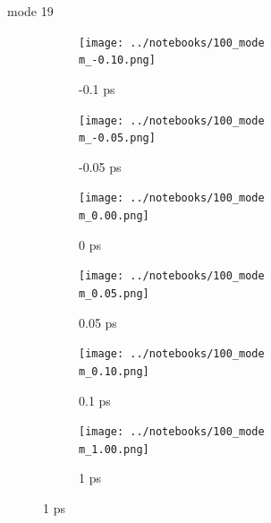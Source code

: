 \documentclass{beamer}
\begin{document}
\renewcommand\m{19}
\begin{frame}{mode \m}
	\begin{figure}
		\centering
		\begin{subfigure}[b]{\w\textwidth}
			\centering
			\texttt{[image: ../notebooks/100\_mode\\m\_-0.10.png]}
			\caption{-0.1 ps}
		\end{subfigure}
		\begin{subfigure}[b]{\w\textwidth}
			\centering
			\texttt{[image: ../notebooks/100\_mode\\m\_-0.05.png]}
			\caption{-0.05 ps}
		\end{subfigure}
		\begin{subfigure}[b]{\w\textwidth}
			\centering
			\texttt{[image: ../notebooks/100\_mode\\m\_0.00.png]}
			\caption{0 ps}
		\end{subfigure}
		\begin{subfigure}[b]{\w\textwidth}
			\centering
			\texttt{[image: ../notebooks/100\_mode\\m\_0.05.png]}
			\caption{0.05 ps}
		\end{subfigure}
		\begin{subfigure}[b]{\w\textwidth}
			\centering
			\texttt{[image: ../notebooks/100\_mode\\m\_0.10.png]}
			\caption{0.1 ps}
		\end{subfigure}
		\begin{subfigure}[b]{\w\textwidth}
			\centering
			\texttt{[image: ../notebooks/100\_mode\\m\_1.00.png]}
			\caption{1 ps}
		\end{subfigure}
	\end{figure}
\end{frame}
\end{document}
